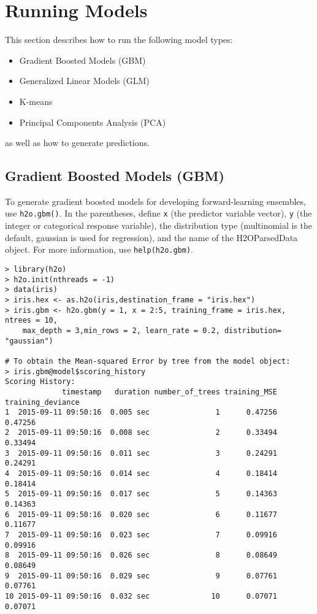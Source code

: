 {{\section{Running Models}
\label{sec:RunModel}

This section describes how to run the following model types:

\begin{itemize}
\item Gradient Boosted Models (GBM)
\item Generalized Linear Models (GLM)
\item K-means 
\item Principal Components Analysis (PCA)

\end{itemize}
as well as how to generate predictions. 


\subsection{Gradient Boosted Models (GBM)}

To generate gradient boosted models for developing forward-learning ensembles, use {\texttt{h2o.gbm()}}.  In the parentheses, define \texttt{x} (the predictor variable vector), \texttt{y} (the integer or categorical response variable), the distribution type (multinomial is the default, gaussian is used for regression), and the name of the H2OParsedData object.
For more information, use {\texttt{help(h2o.gbm)}}.

\waterExampleInR
\medskip
\begin{lstlisting}[style=R]
> library(h2o)
> h2o.init(nthreads = -1)
> data(iris)
> iris.hex <- as.h2o(iris,destination_frame = "iris.hex")
> iris.gbm <- h2o.gbm(y = 1, x = 2:5, training_frame = iris.hex, ntrees = 10,
    max_depth = 3,min_rows = 2, learn_rate = 0.2, distribution= "gaussian")

# To obtain the Mean-squared Error by tree from the model object:
> iris.gbm@model$scoring_history
Scoring History:
             timestamp   duration number_of_trees training_MSE training_deviance
1  2015-09-11 09:50:16  0.005 sec               1      0.47256           0.47256
2  2015-09-11 09:50:16  0.008 sec               2      0.33494           0.33494
3  2015-09-11 09:50:16  0.011 sec               3      0.24291           0.24291
4  2015-09-11 09:50:16  0.014 sec               4      0.18414           0.18414
5  2015-09-11 09:50:16  0.017 sec               5      0.14363           0.14363
6  2015-09-11 09:50:16  0.020 sec               6      0.11677           0.11677
7  2015-09-11 09:50:16  0.023 sec               7      0.09916           0.09916
8  2015-09-11 09:50:16  0.026 sec               8      0.08649           0.08649
9  2015-09-11 09:50:16  0.029 sec               9      0.07761           0.07761
10 2015-09-11 09:50:16  0.032 sec              10      0.07071           0.07071
\end{lstlisting}


}}

